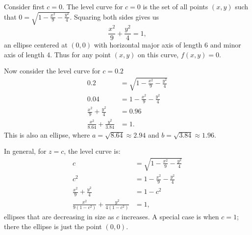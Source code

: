 {Consider first $c=0$. The level curve for $c=0$ is the set of all points $(x,y)$ such that $0=\sqrt{1-\frac{x^2}9-\frac{y^2}4}$. Squaring both sides  gives us
\[\frac{x^2}9+\frac{y^2}4=1,\]
an ellipse centered at $(0,0)$ with horizontal major axis of length 6 and minor axis of length 4. Thus for any point $(x,y)$ on this curve, $f(x,y) = 0$.

Now consider the level curve for $c=0.2$
\begin{align*}
0.2 &= \sqrt{1-\frac{x^2}9-\frac{y^2}4}\\
0.04 &= 1-\frac{x^2}9-\frac{y^2}4\\
\frac{x^2}9+\frac{y^2}4 &=0.96\\
\frac{x^2}{8.64}+\frac{y^2}{3.84} &=1.
\end{align*}
This is also an ellipse, where $a = \sqrt{8.64}\approx 2.94$ and $b=\sqrt{3.84}\approx 1.96$.

In general, for $z=c$, the level curve is:
\begin{align*}
c &= \sqrt{1-\frac{x^2}9-\frac{y^2}4}\\
c^2 &= 1-\frac{x^2}9-\frac{y^2}4\\
\frac{x^2}9+\frac{y^2}4 &=1-c^2\\
\frac{x^2}{9(1-c^2)}+\frac{y^2}{4(1-c^2)} &=1,
\end{align*}
ellipses that are decreasing in size as $c$ increases. A special case is when $c=1$; there the ellipse is just the point $(0,0)$. 

}
